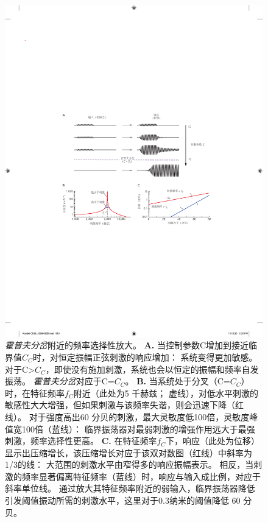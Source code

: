\begin{figure}[htbp]
	\centering
	\includegraphics[width=0.95\linewidth]{chap26/fig_26_15}
	\caption{\textit{霍普夫分岔}附近的频率选择性放大。
		\textbf{A.} 当控制参数C增加到接近临界值$C_C$时，对恒定振幅正弦刺激的响应增加：
		系统变得更加敏感。
		对于C>$C_C$，即使没有施加刺激，系统也会以恒定的振幅和频率自发振荡。
		\textit{霍普夫分岔}对应于C=$C_C$。
		\textbf{B.} 当系统处于分叉（C=$C_C$）时，在特征频率$f_C$附近（此处为5 千赫兹；
		虚线），对低水平刺激的敏感性大大增强，但如果刺激与该频率失谐，则会迅速下降（红线）。
		对于强度高出60 分贝的刺激，最大灵敏度低100倍，灵敏度峰值宽100倍（蓝线）：
		临界振荡器对最弱刺激的增强作用远大于最强刺激，频率选择性更高。
		\textbf{C.} 在特征频率$f_C$下，响应（此处为位移）显示出压缩增长，该压缩增长对应于该双对数图（红线）中斜率为1/3的线：
		大范围的刺激水平由窄得多的响应振幅表示。
		相反，当刺激的频率显著偏离特征频率（蓝线）时，响应与输入成比例，对应于斜率单位线。
		通过放大其特征频率附近的弱输入，临界振荡器降低引发阈值振动所需的刺激水平，这里对于0.3纳米的阈值降低 60 分贝。}
	\label{fig:26_15}
\end{figure}


